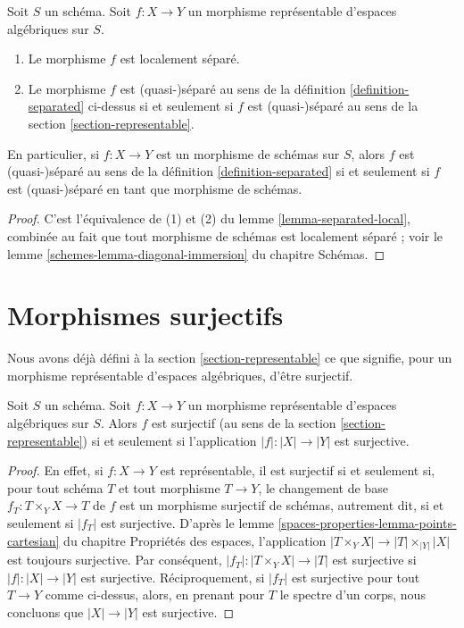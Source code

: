 \begin{lemma}
\label{lemma-match-separated}
Soit $S$ un schéma.
Soit $f : X \to Y$ un morphisme représentable d'espaces algébriques sur $S$.
\begin{enumerate}
\item Le morphisme $f$ est localement séparé.
\item Le morphisme $f$ est (quasi-)séparé au sens de la
définition \ref{definition-separated}
ci-dessus si et seulement si $f$ est (quasi-)séparé au sens de la
section \ref{section-representable}.
\end{enumerate}
En particulier, si $f : X \to Y$ est un morphisme de schémas sur $S$, alors
$f$ est (quasi-)séparé au sens de la
définition \ref{definition-separated}
si et seulement si $f$ est (quasi-)séparé en tant que morphisme de schémas.
\end{lemma}

\begin{proof}
C'est l'équivalence de (1) et (2) du
lemme \ref{lemma-separated-local},
combinée au fait que tout morphisme de schémas est localement séparé ; voir le
lemme \ref{schemes-lemma-diagonal-immersion} du chapitre Schémas.
\end{proof}










\section{Morphismes surjectifs}
\label{section-surjective}

\noindent
Nous avons déjà défini à la section \ref{section-representable}
ce que signifie, pour un morphisme représentable d'espaces algébriques,
d'être surjectif.

\begin{lemma}
\label{lemma-surjective-representable}
Soit $S$ un schéma. Soit $f : X \to Y$ un morphisme représentable
d'espaces algébriques sur $S$. Alors
$f$ est surjectif (au sens de la section \ref{section-representable})
si et seulement si l'application $|f| : |X| \to |Y|$ est surjective.
\end{lemma}

\begin{proof}
En effet, si $f : X \to Y$ est représentable, il est surjectif si et seulement si,
pour tout schéma $T$ et tout morphisme $T \to Y$, le changement de base
$f_T : T \times_Y X \to T$ de $f$ est un morphisme surjectif de schémas,
autrement dit, si et seulement si $|f_T|$ est surjective. D'après le
lemme \ref{spaces-properties-lemma-points-cartesian} du chapitre Propriétés des espaces,
l'application $|T \times_Y X| \to |T| \times_{|Y|} |X|$ est toujours surjective.
Par conséquent, $|f_T| : |T \times_Y X| \to |T|$ est surjective si $|f| : |X| \to |Y|$
est surjective. Réciproquement, si $|f_T|$ est surjective
pour tout $T \to Y$ comme ci-dessus, alors, en prenant pour $T$ le spectre d'un
corps, nous concluons que $|X| \to |Y|$ est surjective.
\end{proof}

